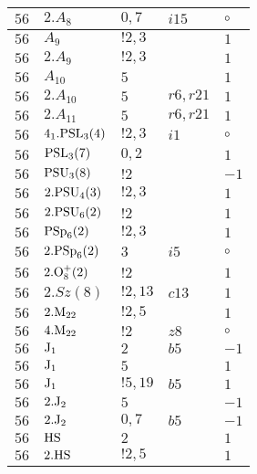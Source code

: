\documentclass[a4paper, 11pt]{article}
\begin{document}
\begin{longtable}{lllll}
        $ 56 $ & $ 2.A_{8} $ & $ 0,7 $ & $ i15 $ &  $\circ$ \\ \hline
        $ 56 $ & $ A_{9} $ & $ ! 2,3 $ & $ ~ $ & $ 1$ \\ \hline
        $ 56 $ & $ 2.A_{9} $ & $ ! 2,3 $ & $ ~ $ & $ 1$ \\ \hline
        $ 56 $ & $ A_{10} $ & $ 5 $ & $ ~ $ & $ 1$ \\ \hline
        $ 56 $ & $ 2.A_{10} $ & $ 5 $ & $ r6, r21 $ & $ 1$ \\ \hline
        $ 56 $ & $ 2.A_{11} $ & $ 5 $ & $ r6, r21 $ & $ 1$ \\ \hline
        $ 56 $ & $ 4_1.{\rm PSL}_{3}(4) $ & $ ! 2,3 $ & $ i1 $ &  $\circ$ \\ \hline
        $ 56 $ & $ {\rm PSL}_{3}(7) $ & $ 0,2 $ & $ ~ $ & $ 1$ \\ \hline
        $ 56 $ & $ {\rm PSU}_{3}(8) $ & $ ! 2 $ & $ ~ $ & $ -1$ \\ \hline
        $ 56 $ & $ 2.{\rm PSU}_{4}(3) $ & $ ! 2,3 $ & $ ~ $ & $ 1$ \\ \hline
        $ 56 $ & $ 2.{\rm PSU}_{6}(2) $ & $ ! 2 $ & $ ~ $ & $ 1$ \\ \hline
        $ 56 $ & $ {\rm PSp}_{6}(2) $ & $ ! 2,3 $ & $ ~ $ & $ 1$ \\ \hline
        $ 56 $ & $ 2.{\rm PSp}_{6}(2) $ & $ 3 $ & $ i5 $ &  $\circ$ \\ \hline
        $ 56 $ & $ 2.{\rm O}_{8}^+(2) $ & $ ! 2 $ & $ ~ $ & $ 1$ \\ \hline
        $ 56 $ & $ 2.Sz(8) $ & $ ! 2,13 $ & $ c13 $ & $ 1$ \\ \hline
        $ 56 $ & $ 2.{\rm M}_{22} $ & $ ! 2,5 $ & $ ~ $ & $ 1$ \\ \hline
        $ 56 $ & $ 4.{\rm M}_{22} $ & $ ! 2 $ & $ z8 $ &  $\circ$ \\ \hline
        $ 56 $ & $ {\rm J}_1 $ & $ 2 $ & $ b5 $ & $ -1$ \\ \hline
        $ 56 $ & $ {\rm J}_1 $ & $ 5 $ & $ ~ $ & $ 1$ \\ \hline
        $ 56 $ & $ {\rm J}_1 $ & $ ! 5,19 $ & $ b5 $ & $ 1$ \\ \hline
        $ 56 $ & $ 2.{\rm J}_2 $ & $ 5 $ & $ ~ $ & $ -1$ \\ \hline
        $ 56 $ & $ 2.{\rm J}_2 $ & $ 0,7 $ & $ b5 $ & $ -1$ \\ \hline
        $ 56 $ & $ {\rm HS} $ & $ 2 $ & $ ~ $ & $ 1$ \\ \hline
        $ 56 $ & $ 2.{\rm HS} $ & $ ! 2,5 $ & $ ~ $ & $ 1$ \\ \hline

\end{longtable}
\end{document}
